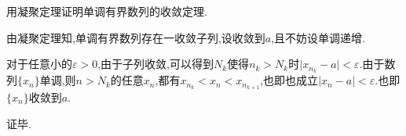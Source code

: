 \documentclass[cn]{elegantbook}
\begin{document}
                \begin{exercise}
                    用凝聚定理证明单调有界数列的收敛定理.
                \end{exercise}
                \begin{solution}
                    由凝聚定理知,单调有界数列存在一收敛子列,设收敛到$a$,且不妨设单调递增.

                    对于任意小的$\varepsilon>0$,由于子列收敛,可以得到$N_k$使得$n_k>N_k$时$\lvert x_{n_k}-a\rvert<\varepsilon$.由于数列$\{x_n\}$单调,则$n>N_k$的任意$x_n$,都有$x_{n_k}<x_n<x_{n_{k+1}}$,也即也成立$\lvert x_n-a\rvert<\varepsilon$.也即$\{x_n\}$收敛到$a$.

                    证毕.
                \end{solution}
\end{document}
